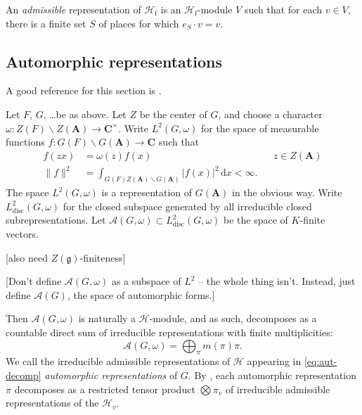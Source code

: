 \documentclass[oneside]{amsart}
\newcommand{\cA}{\mathcal{A}}
\newcommand{\dA}{\mathbf{A}}
\newcommand{\dC}{\mathbf{C}}
\newcommand{\fg}{\mathfrak{g}}
\newcommand{\dd}{\mathrm{d}}
\newcommand{\discrete}{\mathrm{disc}}
\newcommand{\finite}{\mathrm{f}}
\newcommand{\hecke}{\mathcal{H}}
\begin{document}
An \emph{admissible} representation of $\hecke_\finite$ is an 
$\hecke_\finite$-module $V$ such that for each $v\in V$, there is a finite set 
$S$ of places for which $e_S\cdot v = v$. 


\subsection{Automorphic representations}

A good reference for this section is \cite{bj79}. 

Let $F$, $G$, \ldots be as above. Let $Z$ be the center of $G$, and choose a 
character $\omega:Z(F)\backslash Z(\dA)\to \dC^\times$. Write 
$L^2(G,\omega)$ for the space of measurable functions 
$f:G(F)\backslash G(\dA)\to \dC$ such that 
\begin{align*}
  f(z x) &= \omega(z) f(x) && z\in Z(\dA) \\
  \|f\|^2 &= \int_{G(F)Z(\dA)\backslash G(\dA)} |f(x)|^2\, \dd x < \infty .
\end{align*}
The space $L^2(G,\omega)$ is a representation of $G(\dA)$ in the obvious 
way. Write $L_\discrete^2(G,\omega)$ for the closed subspace generated by all 
irreducible closed subrepresentations. Let 
$\cA(G,\omega)\subset L_\discrete^2(G,\omega)$ be the space of $K$-finite 
vectors. 

[also need $Z(\fg)$-finiteness]

[Don't define $\cA(G,\omega)$ as a subspace of $L^2$ -- the whole thing isn't. 
Instead, just define $\cA(G)$, the space of automorphic forms.]

Then $\cA(G,\omega)$ is naturally a $\hecke$-module, and as such, 
decomposes as a countable direct sum of irreducible representations with finite 
multiplicities: 
\begin{equation}\label{eq:aut-decomp}
  \cA(G,\omega) = \bigoplus_\pi m(\pi) \pi .
\end{equation}
We call the irreducible admissible representations of $\hecke$ appearing in 
\eqref{eq:aut-decomp} \emph{automorphic representations} of $G$. By 
\cite[th.4]{f79}, each automorphic representation $\pi$ decomposes as a 
restricted tensor product $\bigotimes \pi_v$ of irreducible admissible 
representations of the $\hecke_v$. 
\end{document}
